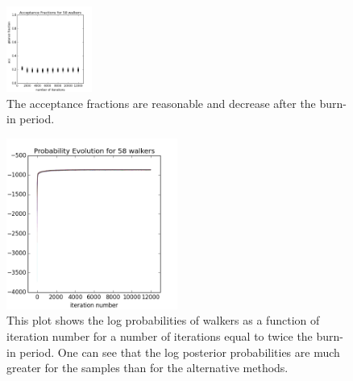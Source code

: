 \documentclass[preprint]{aastex}
\begin{document}
\begin{figure}
\includegraphics[width=0.25\textwidth]{fracs-real.png}
\caption{The acceptance fractions are reasonable and decrease after the burn-in period.}
\label{fig:nullfrac}
\end{figure}

\begin{figure}
\includegraphics[width=0.5\textwidth]{probs-real.png}
\caption{This plot shows the log probabilities of walkers as a function of iteration number for a number of iterations equal to twice the burn-in period.  One can see that the log posterior probabilities are much greater for the samples than for the alternative methods.}
\label{fig:nullprob}
\end{figure}
\end{document}
